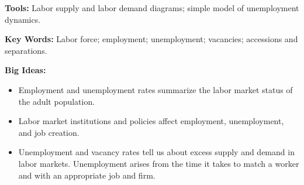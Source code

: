 \textbf{Tools: }Labor supply and labor demand diagrams; simple model of unemployment dynamics.

\textbf{Key Words:} Labor force; employment; unemployment; vacancies; accessions and separations.

\textbf{Big Ideas:}
\begin{itemize}
    \item Employment and unemployment rates summarize the labor market status of the adult population.
    \item Labor market institutions and policies affect employment, unemployment, and job creation.
    \item Unemployment and vacancy rates tell us about excess supply and demand in labor markets. Unemployment arises from the time it takes to match a worker and with an appropriate job and firm.
\end{itemize}
